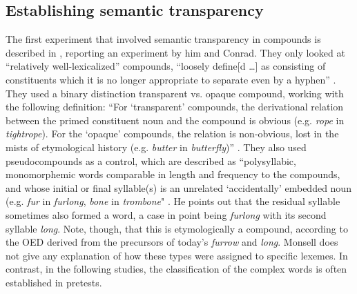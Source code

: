 \subsection{Establishing semantic transparency}
\label{sec:direct_measures}





The first experiment that involved semantic transparency in compounds
is described in
\citet[186--190]{Monsell:1985}, reporting an experiment by him and
Conrad. They only looked at ``relatively well-lexicalized'' compounds,
``loosely define[d \dots ] as consisting of constituents which it is
no longer appropriate to separate even by a hyphen''
\citep[186]{Monsell:1985}. They used a binary distinction transparent
vs. opaque compound, working with the following definition: ``For
`transparent' compounds, the derivational relation between the primed
constituent noun and the compound is obvious (e.g. \emph{rope} in
\emph{tightrope}). For the `opaque' compounds, the relation is
non-obvious, lost in the mists of etymological history
(e.g. \emph{butter} in \emph{butterfly})''
\citep[186]{Monsell:1985}. They also used pseudocompounds as a
control, which are described as ``polysyllabic, monomorphemic words comparable in length and frequency
to the compounds, and whose initial or final syllable(s) is an
unrelated `accidentally' embedded noun (e.g. \emph{fur} in
\emph{furlong}, \emph{bone} in \emph{trombone}"
\citep[186]{Monsell:1985}.   
He points out that
the residual syllable sometimes also formed a word, a case in point
being \emph{furlong} with its second syllable \emph{long}. Note, though, that this is
etymologically a compound, according to the OED derived from the
precursors of today's \emph{furrow} and \emph{long}. Monsell does not give any explanation of how these types were
assigned to specific lexemes. In contrast, in the following
studies, the classification of the complex words is often established in
 pretests.

